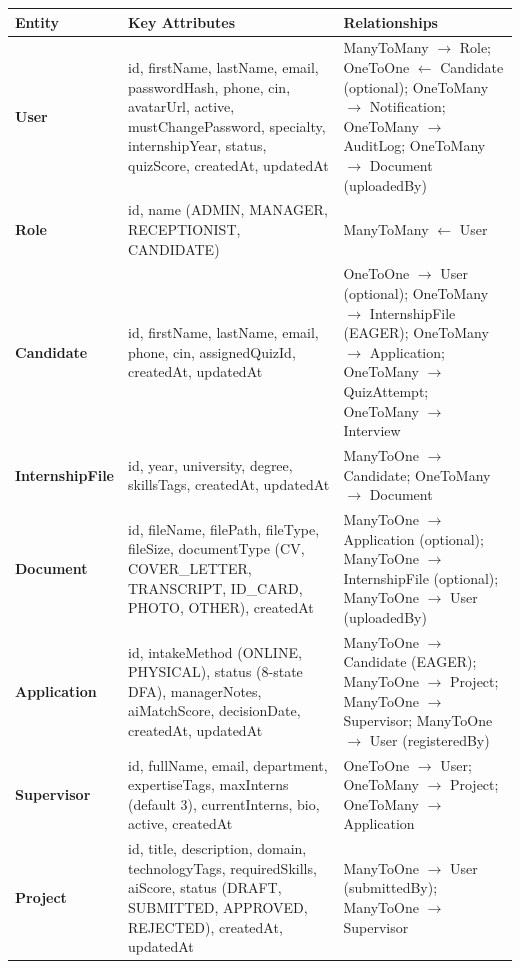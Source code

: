 \begin{table}[H]
\centering
\small
\begin{tabular}{|p{2.5cm}|p{4cm}|p{6.5cm}|}
\hline
\rowcolor{gray!20}
\textbf{Entity} & \textbf{Key Attributes} & \textbf{Relationships} \\
\hline
\textbf{User} & id, firstName, lastName, email, passwordHash, phone, cin, avatarUrl, active, mustChangePassword, specialty, internshipYear, status, quizScore, createdAt, updatedAt & ManyToMany $\rightarrow$ Role; OneToOne $\leftarrow$ Candidate (optional); OneToMany $\rightarrow$ Notification; OneToMany $\rightarrow$ AuditLog; OneToMany $\rightarrow$ Document (uploadedBy) \\
\hline
\textbf{Role} & id, name (ADMIN, MANAGER, RECEPTIONIST, CANDIDATE) & ManyToMany $\leftarrow$ User \\
\hline
\textbf{Candidate} & id, firstName, lastName, email, phone, cin, assignedQuizId, createdAt, updatedAt & OneToOne $\rightarrow$ User (optional); OneToMany $\rightarrow$ InternshipFile (EAGER); OneToMany $\rightarrow$ Application; OneToMany $\rightarrow$ QuizAttempt; OneToMany $\rightarrow$ Interview \\
\hline
\textbf{InternshipFile} & id, year, university, degree, skillsTags, createdAt, updatedAt & ManyToOne $\rightarrow$ Candidate; OneToMany $\rightarrow$ Document \\
\hline
\textbf{Document} & id, fileName, filePath, fileType, fileSize, documentType (CV, COVER\_LETTER, TRANSCRIPT, ID\_CARD, PHOTO, OTHER), createdAt & ManyToOne $\rightarrow$ Application (optional); ManyToOne $\rightarrow$ InternshipFile (optional); ManyToOne $\rightarrow$ User (uploadedBy) \\
\hline
\textbf{Application} & id, intakeMethod (ONLINE, PHYSICAL), status (8-state DFA), managerNotes, aiMatchScore, decisionDate, createdAt, updatedAt & ManyToOne $\rightarrow$ Candidate (EAGER); ManyToOne $\rightarrow$ Project; ManyToOne $\rightarrow$ Supervisor; ManyToOne $\rightarrow$ User (registeredBy) \\
\hline
\textbf{Supervisor} & id, fullName, email, department, expertiseTags, maxInterns (default 3), currentInterns, bio, active, createdAt & OneToOne $\rightarrow$ User; OneToMany $\rightarrow$ Project; OneToMany $\rightarrow$ Application \\
\hline
\textbf{Project} & id, title, description, domain, technologyTags, requiredSkills, aiScore, status (DRAFT, SUBMITTED, APPROVED, REJECTED), createdAt, updatedAt & ManyToOne $\rightarrow$ User (submittedBy); ManyToOne $\rightarrow$ Supervisor \\

\end{tabular}
\end{table}
